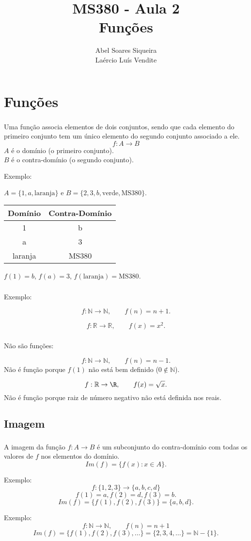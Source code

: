 \documentclass[10 pt]{beamer}
\title{ MS380 - Aula 2 \\
Funções}
\author{Abel Soares Siqueira \\
Laércio Luís Vendite}
\date{}
\newcommand{\makesection}[1]{\section[#1]{#1}}
\newcommand{\makesubsection}[1]{\subsection[#1]{#1}}
\newcommand{\myframe}[1]{
\begin{frame}
 \frametitle{\insertsection \qquad {\small \insertsubsection}}
#1
\end{frame}}
\begin{document}
\begin{frame}
 \titlepage
\end{frame}

\makesection{Funções}

\myframe {
  Uma função associa elementos de dois conjuntos, sendo que cada
  elemento do primeiro conjunto tem um único elemento do segundo
  conjunto associado a ele.
  \pause
  $$f:A\rightarrow B$$
  \pause
  $A$ é o domínio (o primeiro conjunto). \\
  \pause
  $B$ é o contra-domínio (o segundo conjunto).

  Exemplo:

  $A = \{1,a,\mbox{laranja}\}$ e $B = \{2,3,b,\mbox{verde},\mbox{MS380}\}$.

  \begin{center}
    \begin{tabular}{c|c}
      {\bf Domínio} & {\bf Contra-Domínio} \\ \hline
      1 & b \\
      a & 3 \\
      \mbox{laranja} & \mbox{MS380}
    \end{tabular}
  \end{center}

  $f(1) = b$, $f(a) = 3$, $f(\mbox{laranja}) = \mbox{MS380}$.
}

\myframe {
  Exemplo:

  $$f:\mathbb{N}\rightarrow\mathbb{N}, \qquad f(n) = n + 1.$$

  $$f:\mathbb{R}\rightarrow\mathbb{R}, \qquad f(x) = x^2.$$

}

\myframe {
  {\color{red} Não são funções:}

  $$f:\mathbb{N}\rightarrow\mathbb{N}, \qquad f(n) = n - 1.$$
  Não é função porque $f(1)$ não está bem definido ($0 \not\in \mathbb{N}$).

  $$f:\mathbb{R}\rightarrow\R, \qquad f(x) = \sqrt{x}.$$
  Não é função porque raiz de número negativo não está definida nos reais.
}

\makesubsection{Imagem}

\myframe {
  A imagem da função $f:A\rightarrow B$ é um subconjunto do contra-domínio com todas os
  valores de $f$ nos elementos do domínio.
  $$ Im(f) = \{ f(x) : x \in A \}. $$

Exemplo:
  $$ f:\{1,2,3\}\rightarrow\{a,b,c,d\} $$
  $$ f(1) = a, f(2) = d, f(3) = b. $$
  $$ Im(f) = \{f(1),f(2),f(3)\} = \{a,b,d\}. $$

Exemplo:
  $$ f:\mathbb{N}\rightarrow\mathbb{N}, \qquad f(n) = n + 1 $$
  $$ Im(f) = \{f(1),f(2),f(3),\dots\} = \{2,3,4,\dots\} = \mathbb{N}-\{1\}.$$
}
\end{document}
